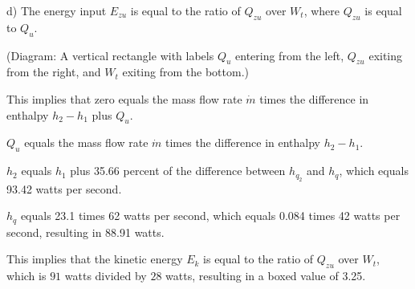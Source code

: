 d) The energy input \( E_{zu} \) is equal to the ratio of \( Q_{zu} \) over \( W_{t} \), where \( Q_{zu} \) is equal to \( Q_u \).

(Diagram: A vertical rectangle with labels \( Q_u \) entering from the left, \( Q_{zu} \) exiting from the right, and \( W_t \) exiting from the bottom.)

This implies that zero equals the mass flow rate \( \dot{m} \) times the difference in enthalpy \( h_2 - h_1 \) plus \( Q_u \).

\( Q_u \) equals the mass flow rate \( \dot{m} \) times the difference in enthalpy \( h_2 - h_1 \).

\( h_2 \) equals \( h_1 \) plus 35.66 percent of the difference between \( h_{q_2} \) and \( h_q \), which equals 93.42 watts per second.

\( h_q \) equals 23.1 times 62 watts per second, which equals 0.084 times 42 watts per second, resulting in 88.91 watts.

This implies that the kinetic energy \( E_k \) is equal to the ratio of \( Q_{zu} \) over \( W_t \), which is \( 91 \) watts divided by \( 28 \) watts, resulting in a boxed value of 3.25.